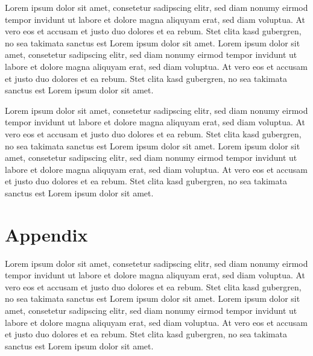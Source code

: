 \documentclass{scrbook}
\begin{document}
Lorem ipsum dolor sit amet, consetetur sadipscing elitr, sed diam
nonumy eirmod tempor invidunt ut labore et dolore magna aliquyam erat,
sed diam voluptua. At vero eos et accusam et justo duo dolores et
ea rebum. Stet clita kasd gubergren, no sea takimata sanctus est Lorem
ipsum dolor sit amet. Lorem ipsum dolor sit amet, consetetur sadipscing
elitr, sed diam nonumy eirmod tempor invidunt ut labore et dolore
magna aliquyam erat, sed diam voluptua. At vero eos et accusam et
justo duo dolores et ea rebum. Stet clita kasd gubergren, no sea takimata
sanctus est Lorem ipsum dolor sit amet.

Lorem ipsum dolor sit amet, consetetur sadipscing elitr, sed diam
nonumy eirmod tempor invidunt ut labore et dolore magna aliquyam erat,
sed diam voluptua. At vero eos et accusam et justo duo dolores et
ea rebum. Stet clita kasd gubergren, no sea takimata sanctus est Lorem
ipsum dolor sit amet. Lorem ipsum dolor sit amet, consetetur sadipscing
elitr, sed diam nonumy eirmod tempor invidunt ut labore et dolore
magna aliquyam erat, sed diam voluptua. At vero eos et accusam et
justo duo dolores et ea rebum. Stet clita kasd gubergren, no sea takimata
sanctus est Lorem ipsum dolor sit amet.


\chapter*{Appendix}

Lorem ipsum dolor sit amet, consetetur sadipscing elitr, sed diam
nonumy eirmod tempor invidunt ut labore et dolore magna aliquyam erat,
sed diam voluptua. At vero eos et accusam et justo duo dolores et
ea rebum. Stet clita kasd gubergren, no sea takimata sanctus est Lorem
ipsum dolor sit amet. Lorem ipsum dolor sit amet, consetetur sadipscing
elitr, sed diam nonumy eirmod tempor invidunt ut labore et dolore
magna aliquyam erat, sed diam voluptua. At vero eos et accusam et
justo duo dolores et ea rebum. Stet clita kasd gubergren, no sea takimata
sanctus est Lorem ipsum dolor sit amet.


\cleardoublepage{}
\end{document}
